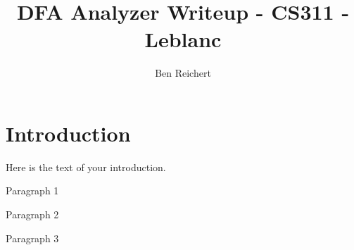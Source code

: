 \documentclass{article}
\begin{document}
\title{DFA Analyzer Writeup - CS311 - Leblanc}
\author{Ben Reichert}

\maketitle

\section{Introduction}
Here is the text of your introduction.



Paragraph 1

Paragraph 2

Paragraph 3
\end{document}
